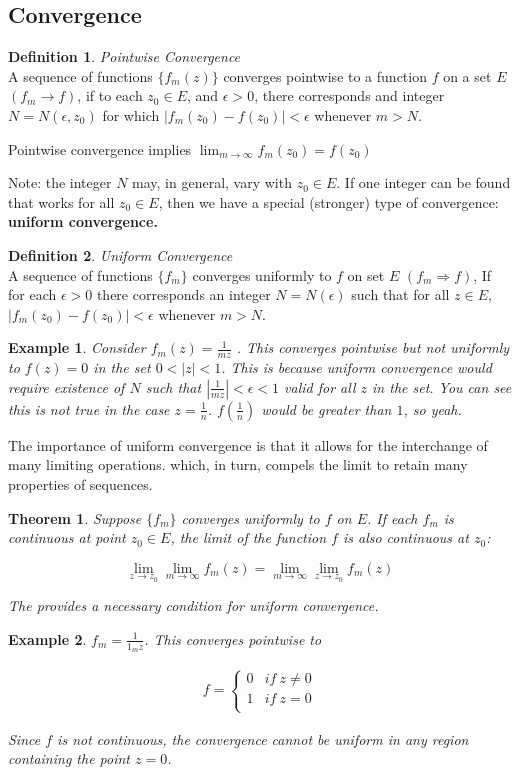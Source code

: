 \documentclass{article}
\newtheorem{theorem}{Theorem}[section]
\newtheorem{ex}{Example}
\theoremstyle{definition}
\newtheorem{definition}{Definition}[section]
\newcommand{\Def}[2]{
\begin{shaded*}
\begin{definition}{\textit{#1}}\\#2\end{definition}
\end{shaded*}
}
\begin{document}
\subsection{Convergence}
\Def{Pointwise Convergence}{A sequence of functions $\{f_m(z)\}$ converges pointwise to a function $f$ on a set $E$ $(f_m \to f)$, if to each $z_0 \in E$, and $\epsilon>0$, there corresponds  and integer $N = N(\epsilon, z_0)$ for which $|f_m(z_0) - f(z_0)|<\epsilon$ whenever $m>N$.

Pointwise convergence implies $\lim_{m\to\infty} f_m(z_0) = f(z_0)$


Note: the integer $N$ may, in general, vary with $z_0 \in E$. If one integer can be found that works for all $z_0 \in E$, then we have a special (stronger) type of convergence: \textbf{uniform convergence.}
}

\Def{Uniform Convergence}{A sequence of functions $\{f_m\}$ converges uniformly to $f$ on set $E$ $(f_m \Rightarrow f)$, If for each $\epsilon>0$ there corresponds an integer $N = N(\epsilon)$ such that for all $z \in E$, $|f_m(z_0) - f(z_0)| < \epsilon$ whenever $m>N$.}

\begin{ex}
Consider $f_m(z) = \frac{1}{mz}$ . This converges pointwise but not uniformly to $f(z)=0$ in the set $0<|z|<1$. This is because uniform convergence would require existence of $N$ such that $\left|\frac{1}{mz}\right| < \epsilon < 1$ valid for all $z$ in the set. You can see this is not true in the case $z = \frac{1}{n}$. $f(\frac{1}{n})$ would be greater than $1$, so yeah. 
\end{ex}

The importance of uniform convergence is that it allows for the interchange of many limiting operations.  which, in turn, compels the limit to retain many properties of sequences.

\begin{theorem}
Suppose $\{f_m\}$ converges uniformly to $f$ on $E$. If each $f_m$ is continuous at point $z_0 \in E$, the limit of the function $f$ is also continuous at $z_0$:

$$\lim_{z \to z_0} \lim_{m \to \infty }f_m(z) = \lim_{m \to \infty }\lim_{z \to z_0}f_m(z)$$


The provides a necessary condition for uniform convergence.
\end{theorem}

\begin{ex}
$f_m = \frac{1}{1_mz}$. This converges pointwise to 

\begin{align*}
f = \begin{cases}
0 & if\ z\neq 0 \\ 1 & if\ z = 0 \\ 
\end{cases}
\end{align*}

Since $f$ is not continuous, the convergence cannot be uniform in any region containing the point $z=0$. 
\end{ex}
\end{document}

